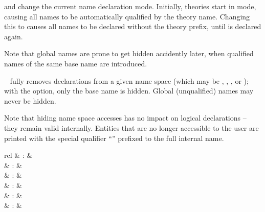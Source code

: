 \begin{isabellebody}
\begin{isamarkuptext}
  \begin{descr}

  \item [\mbox{\isa{\isacommand{global}}} and \mbox{\isa{\isacommand{local}}}] change the
  current name declaration mode.  Initially, theories start in
  \mbox{} mode, causing all names to be automatically
  qualified by the theory name.  Changing this to \mbox{}
  causes all names to be declared without the theory prefix, until
  \mbox{} is declared again.
  
  Note that global names are prone to get hidden accidently later,
  when qualified names of the same base name are introduced.
  
  \item [\mbox{\isa{\isacommand{hide}}}~\isa{space\ names}] fully removes
  declarations from a given name space (which may be ,
  , , or ); with the  option, only the base name is hidden.  Global
  (unqualified) names may never be hidden.
  
  Note that hiding name space accesses has no impact on logical
  declarations -- they remain valid internally.  Entities that are no
  longer accessible to the user are printed with the special qualifier
  ``\isa{{\isacharquery}{\isacharquery}}'' prefixed to the full internal name.

  \end{descr}%
\end{isamarkuptext}%
\isamarkuptrue%
%
\isamarkuptrue%
%
\begin{isamarkuptext}%
\begin{matharray}{rcl}
    \mbox{} & : &  \\
    \mbox{} & : &  \\
    \mbox{} & : & \isartrans{\cdot}{\cdot} \\
    \mbox{} & : & \isartrans{\cdot}{\cdot} \\
    \mbox{} & : &  \\
    \mbox{} & : &  \\
  \end{matharray}


\end{isamarkuptext}
\end{isabellebody}
